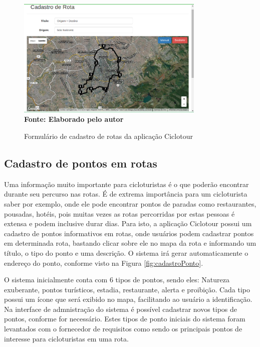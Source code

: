 \begin{figure}[!ht]
	\centering	
	\caption[\hspace{0.1cm} Cadastro de Rotas da aplicação Ciclotour.]
	{Formulário de cadastro de rotas da aplicação Ciclotour}
	  \vspace{-0.4cm}
	\includegraphics[width=0.8\textwidth]{figuras/cadastroRotas.png}
	 \vspace{0cm}
	\\\textbf{\footnotesize Fonte: Elaborado pelo autor}
	\label{fig:cadastroRotas}
\end{figure}

\subsection{Cadastro de pontos em rotas}
Uma informação muito importante para cicloturistas é o que poderão encontrar durante seu percurso nas rotas. É de extrema importância para um 
cicloturista saber por exemplo, onde ele pode encontrar pontos de paradas como restaurantes, pousadas, hotéis, pois muitas vezes as rotas percorridas
por estas pessoas é extensa e podem inclusive durar dias. Para isto, a aplicação Ciclotour possui um cadastro de pontos informativos em rotas, onde
usuários podem cadastrar pontos em determinada rota, bastando clicar sobre ele no mapa da rota e informando um título, o tipo do ponto e uma 
descrição. O sistema irá gerar automaticamente o endereço do ponto, conforme visto na Figura \ref{fig:cadastroPonto}. 

O sistema inicialmente conta com 6 tipos de pontos, sendo eles: Natureza exuberante, pontos turísticos, estadia, restaurante, alerta e proibição. 
Cada tipo possui um ícone que será exibido no mapa, facilitando ao usuário a identificação. Na interface de admnistração do sistema é possível 
cadastrar novos tipos de pontos, conforme for necessário. Estes tipos de ponto iniciais do sistema foram levantados com o fornecedor de requisitos 
como sendo os principais pontos de interesse para cicloturistas em uma rota.

